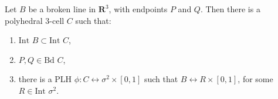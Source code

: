 Let $B$ be a broken line in $\mathbf{R}^3$, with endpoints $P$ and $Q$. Then there is a polyhedral 3-cell $C$ such that:
\begin{enumerate}
\item $\text{Int } B \subset \text{Int } C$,
\item $P, Q \in \text{Bd } C$,
\item there is a PLH $\phi: C \leftrightarrow \sigma^2 \times [0, 1]$ such that $B \leftrightarrow R \times [0, 1]$, for some $R \in \text{Int } \sigma^2$.
\end{enumerate}
